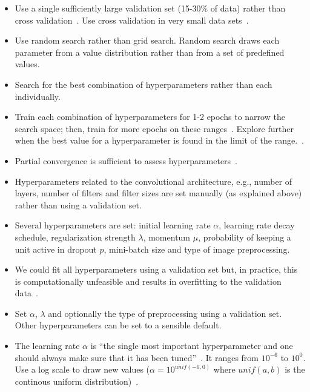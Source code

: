 \begin{itemize}
	\item Use a single sufficiently large validation set (15-30\% of data) rather than cross validation~\cite{Bengio2014}. Use cross validation in very small data sets~\cite{Ng2014}.

	\item Use random search rather than grid search. Random search draws each parameter from a value distribution rather than from a set of predefined values.~\cite{Bergstra2012}

	\item Search for the best combination of hyperparameters rather than each individually.

	\item Train each combination of hyperparameters for 1-2 epochs to narrow the search space; then, train for more epochs on these ranges~\cite{Karpathy2016}. Explore further when the best value for a hyperparameter is found in the limit of the range.~\cite{Bengio2012}.

	\item Partial convergence is sufficient to assess hyperparameters~\cite{Karpathy2016}.

	\item Hyperparameters related to the convolutional architecture, e.g., number of layers, number of filters and filter sizes are set manually (as explained above) rather than using a validation set.

	\item Several hyperparameters are set: initial learning rate $\alpha$, learning rate decay schedule, regularization strength $\lambda$, momentum $\mu$, probability of keeping a unit active in dropout $p$, mini-batch size and type of image preprocessing.

	\item We could fit all hyperparameters using a validation set but, in practice, this is computationally unfeasible and results in overfitting to the validation data~\cite{Cawley2010}.

	\item Set $\alpha$, $\lambda$ and optionally the type of preprocessing using a validation set. Other hyperparameters can be set to a sensible default. 

	\item The learning rate $\alpha$ is ``the single most important hyperparameter and one should always make sure that it has been tuned''~\cite{Bengio2012}. It ranges from $10^{-6}$ to $10^{0}$. Use a log scale to draw new values ($\alpha = 10^{unif(-6, 0)}$ where $unif(a,b)$ is the continous uniform distribution)~\cite{Karpathy2016}.


\end{itemize}

